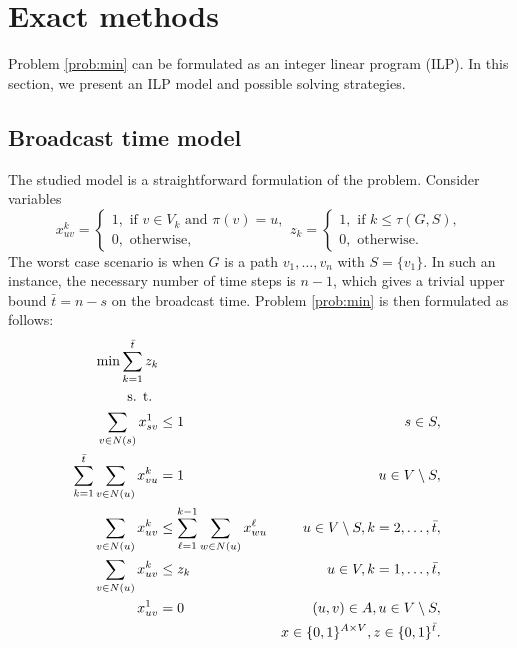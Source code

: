 \section{Exact methods}

Problem \ref{prob:min} can be formulated as an integer linear program (ILP). %
In this section, we present an ILP model and possible solving strategies. 

\subsection{Broadcast time model}
The studied model is a straightforward formulation of the problem.
Consider variables 
$$ x_{uv}^k=
\begin{cases} 
1, \text{ if } v\in V_k \text{ and } \pi(v)=u,\\ 
0, \text{ otherwise},
\end{cases}
z_{k}=\begin{cases}
1, \text{ if } k\leq\tau(G,S),\\
0, \text{ otherwise}.
\end{cases}
$$
The worst case scenario is when $G$ is a path $v_1,\dots,v_n$ with $S=\{v_1\}$. 
In such an instance, the necessary number of time steps is $n-1$, which gives a trivial upper bound $\bar{t}=n-s$ on the broadcast time.
Problem \ref{prob:min} is then formulated as follows: 
\begin{subequations}\label{mod:basic}
\begin{align}
\label{mod:basic:obj} \min \sum\limits_{k=1}^{\bar{t}}z_k \\ 
\notag \text{s. t. } \\
\label{mod:basic:onefromroot} \sum_{v \in N(s)}x^1_{sv} & \leq 1 & s\in S,\\
\label{mod:basic:singlein} \sum\limits_{k=1}^{\bar{t}}\sum\limits_{v\in N(u)}x_{vu}^k & = 1 & u\in V \setminus S,\\
\label{mod:basic:tIncreases} \sum\limits_{v\in N(u)}x_{uv}^k &\leq\sum\limits_{\ell=1}^{k-1}\sum\limits_{w\in N(u)} x_{wu}^{\ell}  & u\in V\setminus S, k=2,\dots,\bar{t},\\
\label{mod:basic:tcrel} \sum\limits_{v\in N(u)}x_{uv}^k & \leq z_k &  u\in V,k=1,\dots,\bar{t},\\
\label{mod:basic:positiveCost}x_{uv}^1 & = 0 & (u,v)\in A, u \in V\setminus S,\\
\label{mod:basic:dim}&&x \in \{0,1\}^{A\times V},z\in\{0,1\}^{\bar{t}}.
\end{align}~
\end{subequations}
